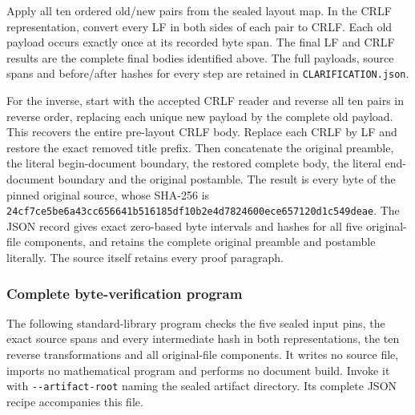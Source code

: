 Apply all ten ordered old/new pairs from the sealed layout map. In the
CRLF representation, convert every LF in both sides of each pair to CRLF.
Each old payload occurs exactly once at its recorded byte span. The final
LF and CRLF results are the complete final bodies identified above.
The full payloads, source spans and before/after hashes for every step are
retained in \nolinkurl{CLARIFICATION.json}.

For the inverse, start with the accepted CRLF reader and reverse all ten
pairs in reverse order, replacing each unique new payload by the complete
old payload. This recovers the entire pre-layout CRLF body. Replace each
CRLF by LF and restore the exact removed title prefix. Then concatenate
the original preamble, the literal begin-document boundary, the restored
complete body, the literal end-document boundary and the original
postamble. The result is every byte of the pinned original source,
whose SHA-256 is
\nolinkurl{24cf7ce5be6a43cc656641b516185df10b2e4d7824600ece657120d1c549deae}.
The JSON record gives exact zero-based byte intervals and hashes for all
five original-file components, and retains the complete original preamble
and postamble literally. The source itself retains every proof paragraph.

\subsubsection{Complete byte-verification program}
The following standard-library program checks the five sealed input pins,
the exact source spans and every intermediate hash in both representations,
the ten reverse transformations and all original-file components. It
writes no source file, imports no mathematical program and performs no
document build. Invoke it with \nolinkurl{--artifact-root} naming the
sealed artifact directory. Its complete JSON recipe accompanies this file.

\endgroup


\endgroup
